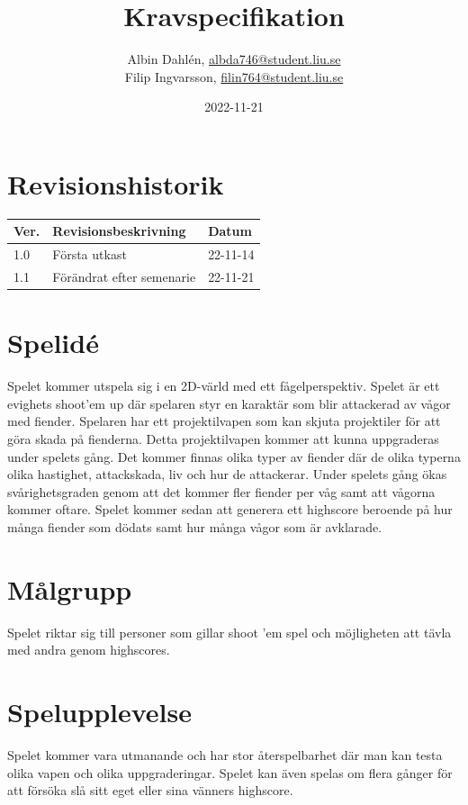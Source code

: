 \documentclass{TDP005mall}
\author{Albin Dahlén, \url{albda746@student.liu.se}\\
Filip Ingvarsson, \url{filin764@student.liu.se}}
\title{Kravspecifikation}
\date{2022-11-21}
\begin{document}
  \projectpage
  \tableofcontents
  \newpage

  \section{Revisionshistorik}
  \begin{table}[!h]
    \begin{tabularx}{\linewidth}{|l|X|l|}
      \hline
      Ver. & Revisionsbeskrivning & Datum \\\hline
      1.0 & Första utkast & 22-11-14 \\\hline
      1.1 & Förändrat efter semenarie & 22-11-21 \\\hline
    \end{tabularx}
  \end{table}


  \section{Spelidé}
  Spelet kommer utspela sig i en 2D-värld med ett fågelperspektiv.
  Spelet är ett evighets shoot'em up där spelaren styr en karaktär som blir attackerad av vågor med fiender.
  Spelaren har ett projektilvapen som kan skjuta projektiler för att göra skada på fienderna.
  Detta projektilvapen kommer att kunna uppgraderas under spelets gång.
  Det kommer finnas olika typer av fiender där de olika typerna olika hastighet, attackskada, liv och hur de attackerar.
  Under spelets gång ökas svårighetsgraden genom att det kommer fler fiender per våg samt att vågorna kommer oftare.
  Spelet kommer sedan att generera ett highscore beroende på hur många fiender som dödats samt hur många vågor som är avklarade.

  \section{Målgrupp}
  Spelet riktar sig till personer som gillar shoot 'em spel och möjligheten att tävla med andra genom highscores.

  \section{Spelupplevelse}
  Spelet kommer vara utmanande och har stor återspelbarhet där man kan testa olika vapen och olika uppgraderingar.
  Spelet kan även spelas om flera gånger för att försöka slå sitt eget eller sina vänners highscore.
\end{document}
